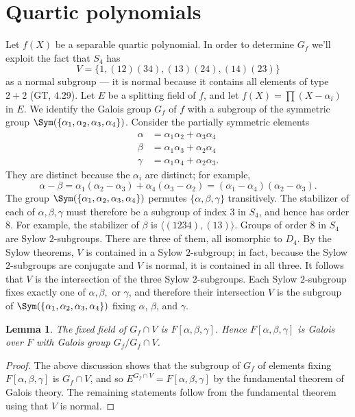 \documentclass[a4paper,11pt,final,openany]{memoir}
\newtheorem{lemma}[X]{Lemma}
\theoremstyle{nonumberplain}
\newtheorem{proof}{Proof.}
\begin{document}
\section{Quartic polynomials}

Let $f(X)$ be a separable quartic polynomial. In order to determine $G_{f}$
we'll exploit the fact that $S_{4}$ has
\[
V=\{1,(12)(34),(13)(24),(14)(23)\}
\]
as a normal subgroup --- it is normal because it contains all elements of type
$2+2$ (GT, 4.29). Let $E$ be a splitting field of $f$, and let
$f(X)=\prod(X-\alpha_{i})$ in $E$. We identify the Galois group $G_{f}$ of $f$
with a subgroup of the symmetric group $\Sym(\{\alpha_{1},\alpha_{2}%
,\alpha_{3},\alpha_{4}\})$. Consider the partially symmetric elements
\begin{align*}
\alpha &  =\alpha_{1}\alpha_{2}+\alpha_{3}\alpha_{4}\\
\beta &  =\alpha_{1}\alpha_{3}+\alpha_{2}\alpha_{4}\\
\gamma &  =\alpha_{1}\alpha_{4}+\alpha_{2}\alpha_{3}.
\end{align*}
They are distinct because the $\alpha_{i}$ are distinct; for example,
\[
\alpha-\beta=\alpha_{1}(\alpha_{2}-\alpha_{3})+\alpha_{4}(\alpha_{3}%
-\alpha_{2})=(\alpha_{1}-\alpha_{4})(\alpha_{2}-\alpha_{3}).
\]
The group $\Sym(\{\alpha_{1},\alpha_{2},\alpha_{3},\alpha_{4}\})$ permutes
$\{\alpha,\beta,\gamma\}$ transitively. The stabilizer of each of
$\alpha,\beta,\gamma$ must therefore be a subgroup of index $3$ in $S_{4}$,
and hence has order $8$. For example, the stabilizer of $\beta$ is $\langle
{}(1234),(13)\rangle$. Groups of order $8$ in $S_{4}$ are Sylow $2$-subgroups.
There are three of them, all isomorphic to $D_{4}$. By the Sylow theorems, $V$
is contained in a Sylow $2$-subgroup; in fact, because the Sylow $2$-subgroups
are conjugate and $V$ is normal, it is contained in all three. It follows that
$V$ is the intersection of the three Sylow $2$-subgroups. Each Sylow
$2$-subgroup fixes exactly one of $\alpha,\beta,$ or $\gamma$, and therefore
their intersection $V$ is the subgroup of $\Sym(\{\alpha_{1},\alpha_{2}%
,\alpha_{3},\alpha_{4}\})$ fixing $\alpha$, $\beta$, and $\gamma$.\bigskip

\begin{lemma}
\label{cg7}The fixed field of $G_{f}\cap V$ is $F[\alpha,\beta,\gamma]$. Hence
$F[\alpha,\beta,\gamma]$ is Galois over $F$ with Galois group $G_{f}/G_{f}\cap
V$.
\end{lemma}
\begin{proof}
The above discussion shows that the subgroup of $G_{f}$ of elements fixing
$F[\alpha,\beta,\gamma]$ is $G_{f}\cap V$, and so $E^{G_{f}\cap V}%
=F[\alpha,\beta,\gamma]$ by the fundamental theorem of Galois theory. The
remaining statements follow from the fundamental theorem using that $V$ is normal.
\end{proof}{\smallskip}
\end{document}
